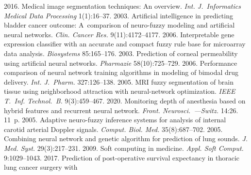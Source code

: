   \begin{multicols}{2}

\renewcommand{\bibname}{\protect\rmfamily References}

{\small\frenchspacing
 {%
 \begin{thebibliography}{99}
 2016. Medical image segmentation techniques: An overview. 
\textit{Int. J.~Informatics Medical Data Processing} 1(1):16--37.
 2003. 
Artificial intelligence in predicting bladder cancer outcome: A~comparison of neuro-fuzzy modeling and 
artificial neural networks. \textit{Clin. Cancer Res.} 9(11):4172--4177.
 2006. Interpretable gene expression classifier with 
an accurate and compact fuzzy rule base for microarray data analysis. 
\textit{Biosystems} 85:165--176.
2003. Prediction of corneal permeability using artificial 
neural networks. \textit{Pharmazie} 58(10):725--729.
 2006. 
Performance comparison of neural network training algorithms in modeling of bimodal drug delivery. 
\textit{Int. J.~Pharm.} 327:126--138.
 2005. MRI fuzzy segmentation of brain tissue using 
neighborhood attraction with neural-network optimization. \textit{IEEE T.~Inf. Technol.~B.} 9(3):459--467.
 2020. Monitoring depth of anesthesia
 based on hybrid 
features and recurrent neural network. \textit{Front. Neurosci.~---Switz.} 14:26. 11~p.
 2005. Adaptive neuro-fuzzy inference systems for analysis of internal carotid 
arterial Doppler signals. \textit{Comput. Biol. Med.} 35(8):687--702.
 2005. Combining neural network and genetic algorithm for prediction 
of lung sounds. \textit{J. Med. Syst.} 29(3):217--231.
 2009. Soft computing in medicine. \textit{Appl. Soft Comput.} 9:1029--1043.
 2017. Prediction of post-operative survival expectancy in thoracic lung cancer surgery with 

\end{thebibliography}}}
\end{multicols}
